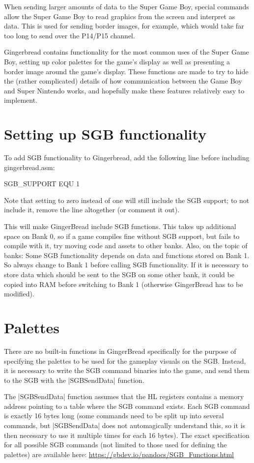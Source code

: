 \documentclass[11pt]{book}
\begin{document}
When sending larger amounts of data to the Super Game Boy, special commands allow the Super Game Boy to read graphics from the screen and interpret as data. This is used for sending border images, for example, which would take far too long to send over the P14/P15 channel.

Gingerbread contains functionality for the most common uses of the Super Game Boy, setting up color palettes for the game's display as well as presenting a border image around the game's display. These functions are made to try to hide the (rather complicated) details of how communication between the Game Boy and Super Nintendo works, and hopefully make these features relatively easy to implement.

\section{Setting up SGB functionality}
To add SGB functionality to Gingerbread, add the following line before including gingerbread.asm:

\begin{code}
SGB_SUPPORT EQU 1
\end{code}

Note that setting to zero instead of one will still include the SGB support; to not include it, remove the line altogether (or comment it out).

This will make GingerBread include SGB functions. This takes up additional space on Bank 0, so if a game compiles fine without SGB support, but fails to compile with it, try moving code and assets to other banks. Also, on the topic of banks: Some SGB functionality depends on data and functions stored on Bank 1. So always change to Bank 1 before calling SGB functionality. If it is necessary to store data which should be sent to the SGB on some other bank, it could be copied into RAM before switching to Bank 1 (otherwise GingerBread has to be modified).

\section{Palettes}
There are no built-in functions in GingerBread specifically for the purpose of specifying the palettes to be used for the gameplay visuals on the SGB. Instead, it is necessary to write the SGB command binaries into the game, and send them to the SGB with the |SGBSendData| function. 

The |SGBSendData| function assumes that the HL registers contains a memory address pointing to a table where the SGB command exists. Each SGB command is exactly 16 bytes long (some commands need to be split up into several commands, but |SGBSendData| does not automagically understand this, so it is then necessary to use it multiple times for each 16 bytes). The exact specification for all possible SGB commands (not limited to those used for defining the palettes) are available here: \url{https://gbdev.io/pandocs/SGB_Functions.html}
\end{document}
